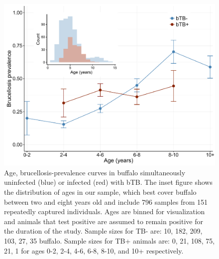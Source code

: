 \documentclass[letterpaper,12pt]{article}
\begin{document}
\begin{figure}
\begin{center}
\includegraphics[width=5in]{Figure1_ageprev}
\end{center}
\caption{Age, brucellosis-prevalence curves in buffalo simultaneously uninfected (blue) or infected (red) with bTB.  The inset figure shows the distribution of ages in our sample, which best cover buffalo between two and eight years old and include 796 samples from 151 repeatedly captured individuals.  Ages are binned for visualization and animals that test positive are assumed to remain positive for the duration of the study.  Sample sizes for TB- are: 10, 182, 209, 103, 27, 35 buffalo.  Sample sizes for TB+ animals are: 0, 21, 108, 75, 21, 1 for ages 0-2, 2-4, 4-6, 6-8, 8-10, and 10+ respectively.}
\label{fig1}
\end{figure}


\pagebreak
\end{document}
